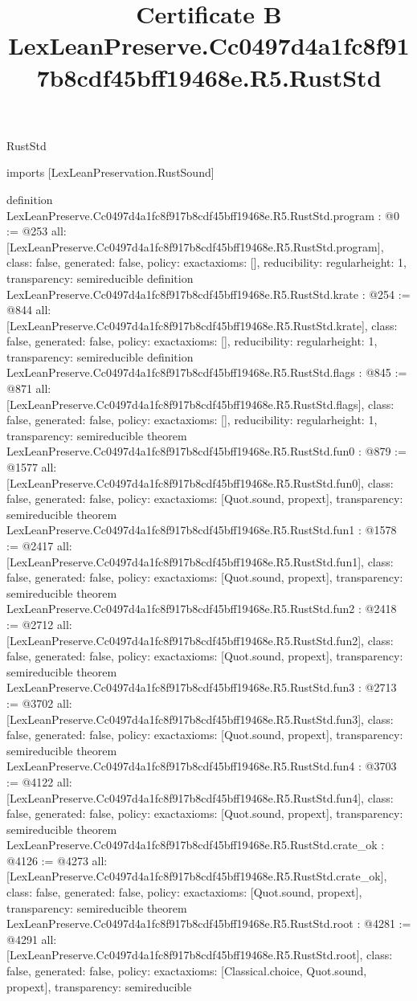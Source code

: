 \begin{lexlean}{RustStd}
\title{Certificate B LexLeanPreserve.Cc0497d4a1fc8f917b8cdf45bff19468e.R5.RustStd}
\begin{coremodule}
imports [LexLeanPreservation.RustSound]

definition LexLeanPreserve.Cc0497d4a1fc8f917b8cdf45bff19468e.R5.RustStd.program : @0 := @253 {
  all: [LexLeanPreserve.Cc0497d4a1fc8f917b8cdf45bff19468e.R5.RustStd.program],
  class: false,
  generated: false,
  policy: exact{axioms: []},
  reducibility: regular{height: 1},
  transparency: semireducible
}
definition LexLeanPreserve.Cc0497d4a1fc8f917b8cdf45bff19468e.R5.RustStd.krate : @254 := @844 {
  all: [LexLeanPreserve.Cc0497d4a1fc8f917b8cdf45bff19468e.R5.RustStd.krate],
  class: false,
  generated: false,
  policy: exact{axioms: []},
  reducibility: regular{height: 1},
  transparency: semireducible
}
definition LexLeanPreserve.Cc0497d4a1fc8f917b8cdf45bff19468e.R5.RustStd.flags : @845 := @871 {
  all: [LexLeanPreserve.Cc0497d4a1fc8f917b8cdf45bff19468e.R5.RustStd.flags],
  class: false,
  generated: false,
  policy: exact{axioms: []},
  reducibility: regular{height: 1},
  transparency: semireducible
}
theorem LexLeanPreserve.Cc0497d4a1fc8f917b8cdf45bff19468e.R5.RustStd.fun0 : @879 := @1577 {
  all: [LexLeanPreserve.Cc0497d4a1fc8f917b8cdf45bff19468e.R5.RustStd.fun0],
  class: false,
  generated: false,
  policy: exact{axioms: [Quot.sound, propext]},
  transparency: semireducible
}
theorem LexLeanPreserve.Cc0497d4a1fc8f917b8cdf45bff19468e.R5.RustStd.fun1 : @1578 := @2417 {
  all: [LexLeanPreserve.Cc0497d4a1fc8f917b8cdf45bff19468e.R5.RustStd.fun1],
  class: false,
  generated: false,
  policy: exact{axioms: [Quot.sound, propext]},
  transparency: semireducible
}
theorem LexLeanPreserve.Cc0497d4a1fc8f917b8cdf45bff19468e.R5.RustStd.fun2 : @2418 := @2712 {
  all: [LexLeanPreserve.Cc0497d4a1fc8f917b8cdf45bff19468e.R5.RustStd.fun2],
  class: false,
  generated: false,
  policy: exact{axioms: [Quot.sound, propext]},
  transparency: semireducible
}
theorem LexLeanPreserve.Cc0497d4a1fc8f917b8cdf45bff19468e.R5.RustStd.fun3 : @2713 := @3702 {
  all: [LexLeanPreserve.Cc0497d4a1fc8f917b8cdf45bff19468e.R5.RustStd.fun3],
  class: false,
  generated: false,
  policy: exact{axioms: [Quot.sound, propext]},
  transparency: semireducible
}
theorem LexLeanPreserve.Cc0497d4a1fc8f917b8cdf45bff19468e.R5.RustStd.fun4 : @3703 := @4122 {
  all: [LexLeanPreserve.Cc0497d4a1fc8f917b8cdf45bff19468e.R5.RustStd.fun4],
  class: false,
  generated: false,
  policy: exact{axioms: [Quot.sound, propext]},
  transparency: semireducible
}
theorem LexLeanPreserve.Cc0497d4a1fc8f917b8cdf45bff19468e.R5.RustStd.crate_ok : @4126 := @4273 {
  all: [LexLeanPreserve.Cc0497d4a1fc8f917b8cdf45bff19468e.R5.RustStd.crate_ok],
  class: false,
  generated: false,
  policy: exact{axioms: [Quot.sound, propext]},
  transparency: semireducible
}
theorem LexLeanPreserve.Cc0497d4a1fc8f917b8cdf45bff19468e.R5.RustStd.root : @4281 := @4291 {
  all: [LexLeanPreserve.Cc0497d4a1fc8f917b8cdf45bff19468e.R5.RustStd.root],
  class: false,
  generated: false,
  policy: exact{axioms: [Classical.choice, Quot.sound, propext]},
  transparency: semireducible
}


\end{coremodule}
\end{lexlean}
